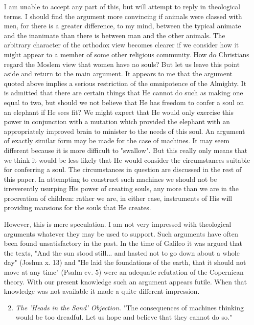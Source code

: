     I am unable to accept any part of this, but will attempt to reply in theological terms. I should find the argument more convincing if animals were classed with men, for there is a greater difference, to my mind, between the typical animate and the inanimate than there is between man and the other animals. The arbitrary character of the orthodox view becomes clearer if we consider how it might appear to a member of some other religious community. How do Christians regard the Moslem view that women have no souls? But let us leave this point aside and return to the main argument. It appears to me that the argument quoted above implies a serious restriction of the omnipotence of the Almighty. It is admitted that there are certain things that He cannot do such as making one equal to two, but should we not believe that He has freedom to confer a soul on an elephant if He sees fit? We might expect that He would only exercise this power in conjunction with a mutation which provided the elephant with an appropriately improved brain to minister to the needs of this soul. An argument of exactly similar form may be made for the case of machines. It may seem different because it is more difficult to "swallow". But this really only means that we think it would be less likely that He would consider the circumstances suitable for conferring a soul. The circumstances in question are discussed in the rest of this paper. In attempting to construct such machines we should not be irreverently usurping His power of creating souls, any more than we are in the procreation of children: rather we are, in either case, instruments of His will providing mansions for the souls that He creates.

    However, this is mere speculation. I am not very impressed with theological arguments whatever they may be used to support. Such arguments have often been found unsatisfactory in the past. In the time of Galileo it was argued that the texts, "And the sun stood still... and hasted not to go down about a whole day" (Joshua x. 13) and "He laid the foundations of the earth, that it should not move at any time" (Psalm cv. 5) were an adequate refutation of the Copernican theory. With our present knowledge such an argument appears futile. When that knowledge was not available it made a quite different impression.
    
    \begin{enumerate}[label=(\arabic*)]
        \setcounter{enumi}{1}
        \item{\textit{The 'Heads in the Sand' Objection.} "The consequences of machines thinking would be too dreadful. Let us hope and believe that they cannot do so."}
    \end{enumerate}

